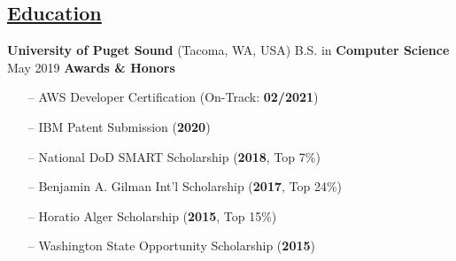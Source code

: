 \documentclass{article}
\begin{document}
\begin{multicols}{2}
\section*{\underline{Education}}
{\footnotesize{
\textbf{University of Puget Sound} (Tacoma, WA, USA)
\newline B.S. in \textbf{Computer Science}
\newline May 2019
\newline\newline\textbf{Awards \& Honors}
\begin{itemize}
	\item[--] AWS Developer Certification (On-Track: \textbf{02/2021})
	\item[--] IBM Patent Submission (\textbf{2020})
	\item[--] National DoD SMART Scholarship (\textbf{2018}, Top 7\%)
	\item[--] Benjamin A. Gilman Int'l Scholarship (\textbf{2017}, Top 24\%)
	\item[--] Horatio Alger Scholarship (\textbf{2015}, Top 15\%)
	\item[--] Washington State Opportunity Scholarship (\textbf{2015})
\end{itemize} 
}}

\hfill  \quad

\end{multicols} 
\end{document}
